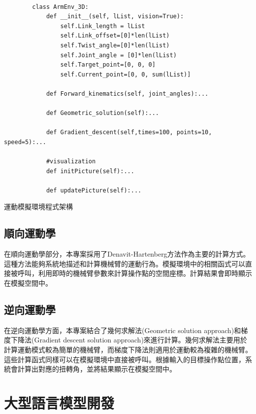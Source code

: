\documentclass[class=NCU_thesis, crop=false]{standalone}
\begin{document}
\begin{listing}
    \begin{verbatim}

        class ArmEnv_3D:
            def __init__(self, lList, vision=True):
                self.Link_length = lList
                self.Link_offset=[0]*len(lList)
                self.Twist_angle=[0]*len(lList)
                self.Joint_angle = [0]*len(lList)
                self.Target_point=[0, 0, 0]
                self.Current_point=[0, 0, sum(lList)]

            def Forward_kinematics(self, joint_angles):...
            
            def Geometric_solution(self):...

            def Gradient_descent(self,times=100, points=10, speed=5):...

            #visualization
            def initPicture(self):...

            def updatePicture(self):...

    \end{verbatim}
\caption{運動模擬環境程式架構} 
\end{listing}

\subsection{順向運動學}
在順向運動學部分，本專案採用了Denavit-Hartenberg方法作為主要的計算方式。這種方法能夠系統地描述和計算機械臂的運動行為。模擬環境中的相關函式可以直接被呼叫，利用即時的機械臂參數來計算操作點的空間座標。計算結果會即時顯示在模擬空間中。

\subsection{逆向運動學}
在逆向運動學方面，本專案結合了幾何求解法(Geometric solution approach)和梯度下降法(Gradient descent solution approach)來進行計算。幾何求解法主要用於計算運動模式較為簡單的機械臂，而梯度下降法則適用於運動較為複雜的機械臂。這些計算函式同樣可以在模擬環境中直接被呼叫。根據輸入的目標操作點位置，系統會計算出對應的扭轉角，並將結果顯示在模擬空間中。

\section{大型語言模型開發}
\end{document}
